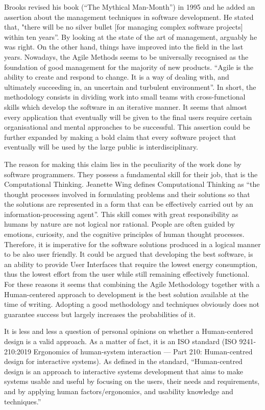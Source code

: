 Brooks revised his book (“The Mythical Man-Month”) in 1995 and he added an assertion about the management techniques in software development. He stated that, "there will be no silver bullet [for managing complex software projects] within ten years”.
By looking at the state of the art of management, arguably he was right. On the other hand, things have improved into the field in the last years. Nowadays, the Agile Methods seems to be universally recognised as the foundation of good management for the majority of new products. “Agile is the ability to create and respond to change. It is a way of dealing with, and ultimately succeeding in, an uncertain and turbulent environment”. In short, the methodology consists in dividing work into small teams with cross-functional skills which develop the software in an iterative manner.
It seems that almost every application that eventually will be given to the final users require certain organisational and mental approaches to be successful. This assertion could be further expanded by making a bold claim that every software project that eventually will be used by the large public is interdisciplinary.

The reason for making this claim lies in the peculiarity of the work done by software programmers. They possess a fundamental skill for their job, that is the Computational Thinking. Jeanette Wing defines Computational Thinking as “the thought processes involved in formulating problems and their solutions so that the solutions are represented in a form that can be effectively carried out by an information-processing agent”.
This skill comes with great responsibility as humans by nature are not logical nor rational. People are often guided by emotions, curiosity, and the cognitive principles of human thought processes. Therefore, it is imperative for the software solutions produced in a logical manner to be also user friendly. It could be argued that developing the best software, is an ability to provide User Interfaces that require the lowest energy consumption, thus the lowest effort from the user while still remaining effectively functional.
For these reasons it seems that combining the Agile Methodology together with a Human-centered approach to development is the best solution available at the time of writing. Adopting a good methodology and techniques obviously does not guarantee success but largely increases the probabilities of it.

It is less and less a question of personal opinions on whether a Human-centered design is a valid approach. As a matter of fact, it is an ISO standard (ISO 9241-210:2019 Ergonomics of human-system interaction — Part 210: Human-centred design for interactive systems).
As defined in the standard, “Human-centred design is an approach to interactive systems development that aims to make systems usable and useful by focusing on the users, their needs and requirements, and by applying human factors/ergonomics, and usability knowledge and techniques.”

